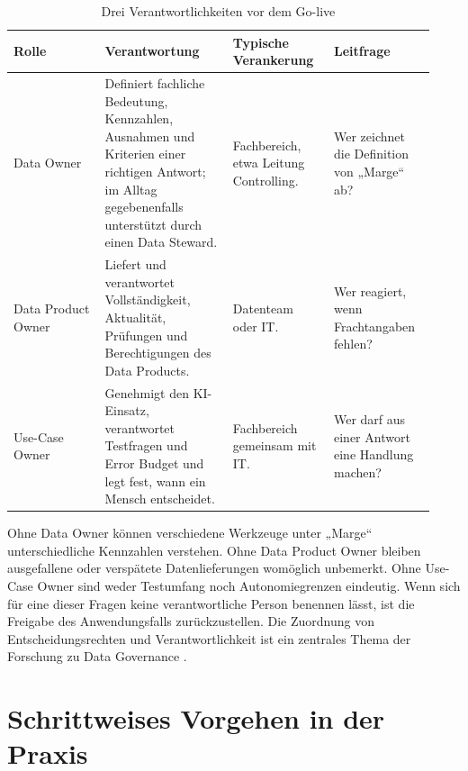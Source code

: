 \documentclass[a4paper,12pt,twoside]{report}
\theoremstyle{definition}
\begin{document}
\begin{table}[htbp]
\centering
\small
\caption{Drei Verantwortlichkeiten vor dem Go-live}
\label{tab:accountabilities}
\begin{tabular}{p{0.20\linewidth}p{0.29\linewidth}p{0.22\linewidth}p{0.22\linewidth}}
\toprule
\textbf{Rolle} & \textbf{Verantwortung} & \textbf{Typische Verankerung} & \textbf{Leitfrage} \\
\midrule
Data Owner & Definiert fachliche Bedeutung, Kennzahlen, Ausnahmen und Kriterien einer richtigen Antwort; im Alltag gegebenenfalls unterstützt durch einen Data Steward. & Fachbereich, etwa Leitung Controlling. & Wer zeichnet die Definition von „Marge“ ab? \\
Data Product Owner & Liefert und verantwortet Vollständigkeit, Aktualität, Prüfungen und Berechtigungen des Data Products. & Datenteam oder IT. & Wer reagiert, wenn Frachtangaben fehlen? \\
Use-Case Owner & Genehmigt den KI-Einsatz, verantwortet Testfragen und Error Budget und legt fest, wann ein Mensch entscheidet. & Fachbereich gemeinsam mit IT. & Wer darf aus einer Antwort eine Handlung machen? \\
\bottomrule
\end{tabular}
\end{table}

Ohne Data Owner können verschiedene Werkzeuge unter „Marge“ unterschiedliche Kennzahlen verstehen. Ohne Data Product Owner bleiben ausgefallene oder verspätete Datenlieferungen womöglich unbemerkt. Ohne Use-Case Owner sind weder Testumfang noch Autonomiegrenzen eindeutig. Wenn sich für eine dieser Fragen keine verantwortliche Person benennen lässt, ist die Freigabe des Anwendungsfalls zurückzustellen. Die Zuordnung von Entscheidungsrechten und Verantwortlichkeit ist ein zentrales Thema der Forschung zu Data Governance \cite{abraham19,khatribrown10,otto11}.

\chapter{Schrittweises Vorgehen in der Praxis}
\label{sec:implementation}
\end{document}
